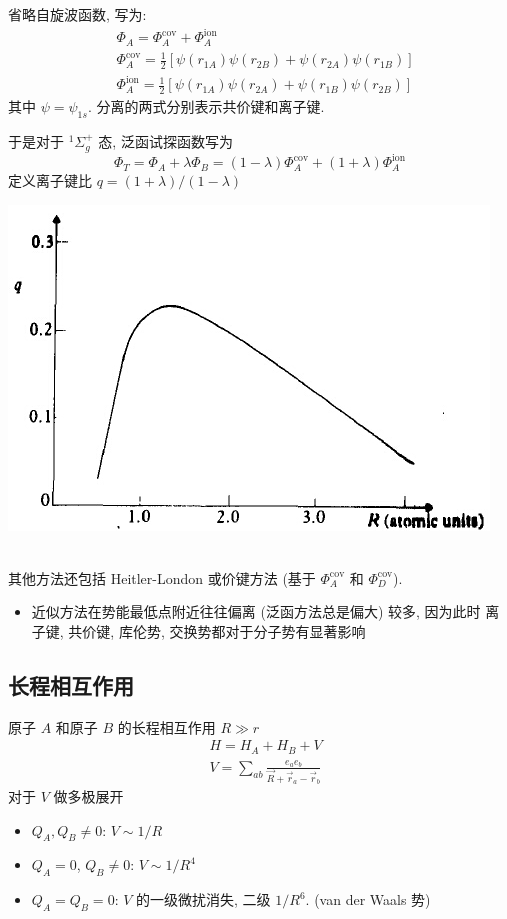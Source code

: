 \documentclass[10pt,a4paper,twocolumn]{article} %
\numberwithin{equation}{section} %
\begin{document}
省略自旋波函数, 写为: 
\begin{align}
	&\Phi_A = \Phi_A^{\mathrm{cov}} + \Phi_A^{\mathrm{ion}}\\
	&\Phi_A^{\mathrm{cov}} = \frac 12\left[\psi(r_{1A})\psi(r_{2B})+
		\psi(r_{2A})\psi(r_{1B})\right]\\
	&\Phi_A^{\mathrm{ion}} = \frac 12\left[\psi(r_{1A})\psi(r_{2A})+
		\psi(r_{1B})\psi(r_{2B})\right]
\end{align}
其中 $\psi = \psi_{1s}$. 分离的两式分别表示共价键和离子键. 

于是对于 $^1\Sigma^+_g$ 态, 泛函试探函数写为
\begin{equation}
	\Phi_T = \Phi_A+\lambda\Phi_B = (1-\lambda)\Phi_A^{\mathrm{cov}} 
+ (1+\lambda)\Phi_A^{\mathrm{ion}}
\end{equation}
定义离子键比 $q = (1+\lambda)/(1-\lambda)$ \\
\begin{centering}
	\includegraphics[width=0.9\linewidth]{cov-ion.jpg}
\end{centering}\\
其他方法还包括 Heitler-London 或价键方法 (基于 $\Phi_A^{\mathrm{cov}}$ 和
$\Phi_D^{\mathrm{cov}}$). 
\begin{itemize}
	\item 近似方法在势能最低点附近往往偏离 (泛函方法总是偏大) 较多, 因为此时
	离子键, 共价键, 库伦势, 交换势都对于分子势有显著影响
\end{itemize}
\subsection{长程相互作用} %
\label{sub:long_range_interaction}
原子 $A$ 和原子 $B$ 的长程相互作用 $R\gg r$
\begin{align}
	& H = H_A + H_B + V\\
	& V = \sum_{ab}\frac{e_a e_b}{\vec R + \vec r_a - \vec r_b}
\end{align}
对于 $V$ 做多极展开
\begin{itemize}
	\item $Q_A, Q_B\neq 0$: $V\sim 1/R$
	\item $Q_A = 0$, $Q_B\neq 0$: $V\sim 1/R^4$
	\item $Q_A = Q_B = 0$: $V$ 的一级微扰消失, 二级 $1/R^6$. (van der Waals 势)
\end{itemize}
\end{document}
